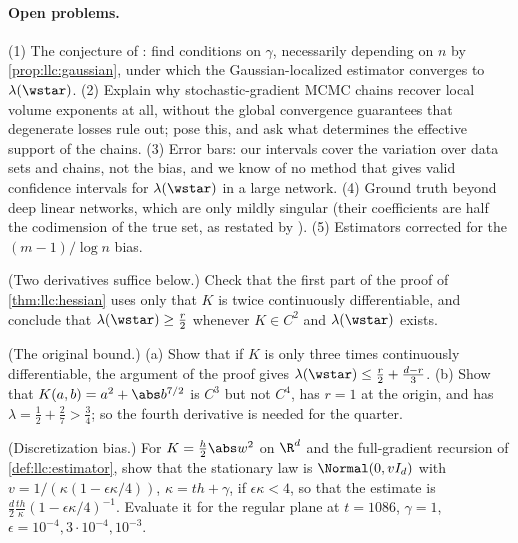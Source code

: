 \begin{refsection}
\paragraph{Open problems.} (1) The conjecture of \textcite[Appendix~D]{LauEtAl2025}: find conditions on $\gamma$, necessarily depending on $n$ by \cref{prop:llc:gaussian}, under which the Gaussian-localized estimator converges to $\lambda(\wstar)$. (2) Explain why stochastic-gradient MCMC chains recover local volume exponents at all, without the global convergence guarantees that degenerate losses rule out; \textcite{HitchcockHoogland2025} pose this, and ask what determines the effective support of the chains. (3) Error bars: our intervals cover the variation over data sets and chains, not the bias, and we know of no method that gives valid confidence intervals for $\lambda(\wstar)$ in a large network. (4) Ground truth beyond deep linear networks, which are only mildly singular (their coefficients are half the codimension of the true set, \textcite{PepinLehalleurRimanyi2024} as restated by \textcite{HitchcockHoogland2025}). (5) Estimators corrected for the $(m-1)/\log n$ bias.

\begin{exercises}
\item \consolidation (Two derivatives suffice below.) Check that the first part of the proof of \cref{thm:llc:hessian} uses only that $K$ is twice continuously differentiable, and conclude that $\lambda(\wstar)\ge\tfrac r2$ whenever $K\in C^2$ and $\lambda(\wstar)$ exists.\label{ex:llc:twoderivs}

\item \consolidation (The original bound.) (a) Show that if $K$ is only three times continuously differentiable, the argument of the proof gives $\lambda(\wstar)\le\tfrac r2+\tfrac{d-r}3$. (b) Show that $K(a,b)=a^2+\abs b^{7/2}$ is $C^3$ but not $C^4$, has $r=1$ at the origin, and has $\lambda=\tfrac12+\tfrac27>\tfrac34$; so the fourth derivative is needed for the quarter.\label{ex:llc:original}

\item \consolidation (Discretization bias.) For $K=\frac h2\abs w^2$ on $\R^d$ and the full-gradient recursion of \cref{def:llc:estimator}, show that the stationary law is $\Normal(0,vI_d)$ with $v=1/(\kappa(1-\epsilon\kappa/4))$, $\kappa=th+\gamma$, if $\epsilon\kappa<4$, so that the estimate is $\frac d2\frac{th}\kappa(1-\epsilon\kappa/4)^{-1}$. Evaluate it for the regular plane at $t=1086$, $\gamma=1$, $\epsilon=10^{-4},3\cdot10^{-4},10^{-3}$.\label{ex:llc:ula}


\end{exercises}
\end{refsection}
